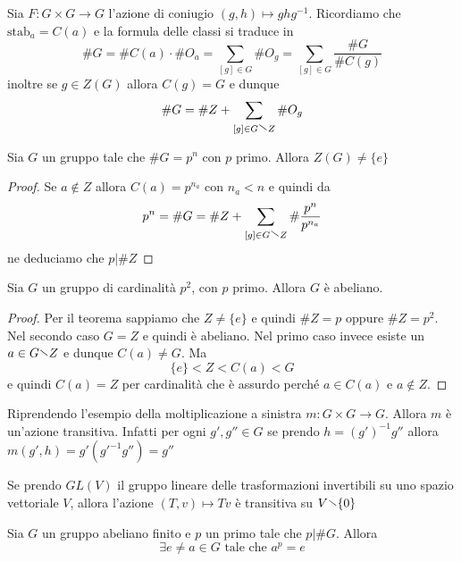 \begin{corollary}\label{cor:classi_coniugio}
    Sia \(F : G \times G \to G\) l'azione di coniugio \({(g, h)} \mapsto
    ghg^{-1}\). Ricordiamo che \(\mathrm{stab}_a = C{(a)}\) e la formula delle
    classi si traduce in 
    \[
        \# G = \# C{(a)} \cdot \# O_a = \sum_{[g] \in G} \# O_g = \sum_{[g] \in
        G} \frac{\# G}{\# C{(g)}}
    \]
    inoltre se \(g \in Z{(G)}\) allora \(C{(g)} = G\) e dunque
    \[
        \# G = \# Z + \sum_{[g] \in G\sminus Z} \# O_g
    \]
\end{corollary}
\begin{theorem}
    Sia \(G\) un gruppo tale che \(\# G = p^{n}\) con \(p\) primo. Allora
    \(Z{(G)} \neq \{e\} \) 
\end{theorem}
\begin{proof}
    Se \(a \not\in Z\) allora \(C{(a)} = p^{n_a}\) con \(n_a < n\) e quindi da
    \[
        p^{n} = \# G = \# Z + \sum_{[g] \in G\sminus Z} \# \frac{p^{n}}{p^{n_a}}
    \]
    ne deduciamo che \(p | \#Z\) 
\end{proof}
\begin{corollary}
    Sia \(G\) un gruppo di cardinalità \(p^2\), con \(p\) primo. Allora \(G\) è
    abeliano.
\end{corollary}
\begin{proof}
    Per il teorema sappiamo che \(Z \neq \{e\} \) e quindi \(\# Z = p\) oppure
    \(\# Z = p^2\). Nel secondo caso \(G = Z\) e quindi è abeliano. Nel primo
    caso invece esiste un \(a \in G \sminus Z\) e dunque \(C{(a)} \neq G\). Ma
    \[
        \{e\} < Z < C{(a)} < G
    \]
    e quindi \(C{(a)} = Z\) per cardinalità che è assurdo perché \(a \in
    C{(a)}\) e \(a \not\in Z\).
\end{proof}
\begin{example}
    Riprendendo l'esempio della moltiplicazione a sinistra \(m : G \times G \to
    G\). Allora \(m\) è un'azione transitiva. Infatti per ogni \(g', g'' \in G\) se
    prendo \(h = {(g')}^{-1} g''\) allora \(m {(g', h)} = g'{(g'^{-1} g'')} =
    g''\) 
\end{example}
\begin{example}
    Se prendo \(GL{(V)}\) il gruppo lineare delle trasformazioni invertibili su
    uno spazio vettoriale \(V\), allora l'azione \({(T, v)} \mapsto Tv\) è
    transitiva su \(V \sminus \{0\}\)  
\end{example}
\begin{theorem}
    Sia \(G\) un gruppo abeliano finito e \(p\) un primo tale che \(p | \# G\).
    Allora 
    \[
      \exists e\neq a \in G \text{ tale che } a^{p} = e
    \]
\end{theorem}
